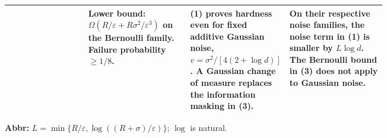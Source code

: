 \begin{table}[tp]
\begin{threeparttable}
\begin{tabularx}{\linewidth}{@{}>{\raggedright\arraybackslash}p{0.21\linewidth}>{\raggedright\arraybackslash}p{0.27\linewidth}>{\raggedright\arraybackslash}p{0.26\linewidth}>{\raggedright\arraybackslash}X@{}}
& Lower bound: $\Omega(R/\varepsilon+R\sigma^2/\varepsilon^3)$ on the Bernoulli family. Failure probability $\ge1/8$.
& \textbf{(1)} proves hardness even for fixed additive Gaussian noise, $v=\sigma^2/[4(2+\log d)]$. A Gaussian change of measure replaces the information masking in \textbf{(3)}.
& On their respective noise families, the noise term in \textbf{(1)} is smaller by $L\log d$. The Bernoulli bound in \textbf{(3)} does not apply to Gaussian noise. \\
\bottomrule
\end{tabularx}
\begin{tablenotes}[flushleft]\footnotesize
\item[] \textbf{Abbr:} $L=\min\{R/\varepsilon,\log((R+\sigma)/\varepsilon)\}$; $\log$ is natural.
\end{tablenotes}
\end{threeparttable}
\end{table}
